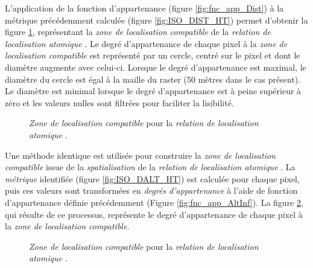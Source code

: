 L’application de la fonction d'appartenance (figure
\ref{fig:fnc_app_Dist}) à la métrique précédemment calculée (figure
\ref{fig:ISO_DIST_HT}) permet d'obtenir la figure
\ref{fig:ZLC_DIST_HT}, représentant la \emph{zone de localisation
  compatible} de la \emph{relation de localisation atomique}
. Le degré d'appartenance de chaque pixel à la
\emph{zone de localisation compatible} est représenté par un cercle,
centré sur le pixel et dont le diamètre augmente avec
celui-ci. Lorsque le degré d'appartenance est maximal, le diamètre du
cercle est égal à la maille du raster (50 mètres dans le cas
présent). Le diamètre est minimal lorsque le degré d'appartenance est
à peine supérieur à zéro et les valeurs nulles sont filtrées pour
faciliter la lisibilité.

\begin{figure}
  \centering
  
  \caption{\emph{Zone de localisation compatible} pour la
    \emph{relation de localisation atomique}
    \protect{}.}
  \label{fig:ZLC_DIST_HT}
\end{figure}

Une méthode identique est utilisée pour construire la \emph{zone de
  localisation compatible} issue de la \emph{spatialisation} de la
\emph{relation de localisation atomique}
. La
\emph{métrique} identifiée (figure \ref{fig:ISO_DALT_HT}) est calculée
pour chaque pixel, puis ces valeurs sont transformées en \emph{degrés
  d'appartenance} à l'aide de fonction d'appartenance définie
précédemment (Figure \ref{fig:fnc_app_AltInf}). La figure
\ref{fig:ZLC_ALTINF_HT}, qui résulte de ce processus, représente le
degré d'appartenance de chaque pixel à la \emph{zone de localisation
  compatible.}

\begin{figure}
  \centering
  
  \caption{\emph{Zone de localisation compatible} pour la
    \emph{relation de localisation atomique}
    \protect{}.}
  \label{fig:ZLC_ALTINF_HT}
\end{figure}

